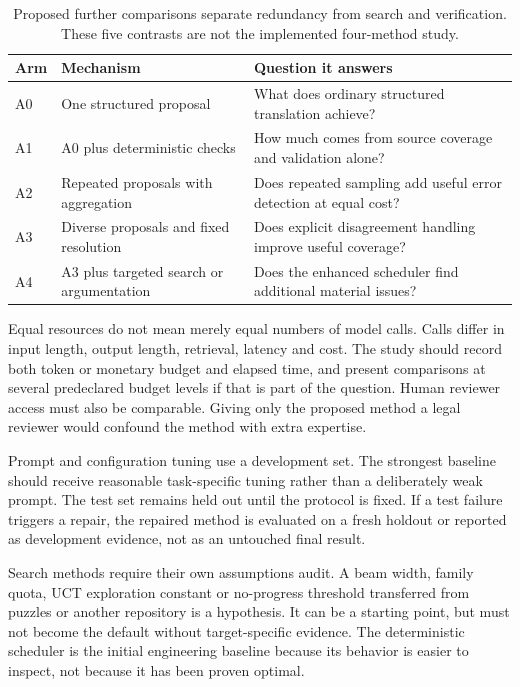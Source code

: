 \begin{table}[H]
\centering
\caption{Proposed further comparisons separate redundancy from search and verification. These five contrasts are not the implemented four-method study.}
\begin{tabularx}{\textwidth}{P{16mm}YY}
\toprule
Arm & Mechanism & Question it answers\\
\midrule
A0 & One structured proposal & What does ordinary structured translation achieve?\\
\addlinespace[0.5em]
A1 & A0 plus deterministic checks & How much comes from source coverage and validation alone?\\
\addlinespace[0.5em]
A2 & Repeated proposals with aggregation & Does repeated sampling add useful error detection at equal cost?\\
\addlinespace[0.5em]
A3 & Diverse proposals and fixed resolution & Does explicit disagreement handling improve useful coverage?\\
\addlinespace[0.5em]
A4 & A3 plus targeted search or argumentation & Does the enhanced scheduler find additional material issues?\\
\bottomrule
\end{tabularx}
\end{table}


Equal resources do not mean merely equal numbers of model calls. Calls differ in
input length, output length, retrieval, latency and cost. The study should record
both token or monetary budget and elapsed time, and present comparisons at
several predeclared budget levels if that is part of the question. Human reviewer
access must also be comparable. Giving only the proposed method a legal reviewer
would confound the method with extra expertise.

Prompt and configuration tuning use a development set. The strongest baseline
should receive reasonable task-specific tuning rather than a deliberately weak
prompt. The test set remains held out until the protocol is fixed. If a test
failure triggers a repair, the repaired method is evaluated on a fresh holdout or
reported as development evidence, not as an untouched final result.

Search methods require their own assumptions audit. A beam width, family quota,
UCT exploration constant or no-progress threshold transferred from puzzles or
another repository is a hypothesis. It can be a starting point, but must not
become the default without target-specific evidence. The deterministic scheduler
is the initial engineering baseline because its behavior is easier to inspect,
not because it has been proven optimal.

